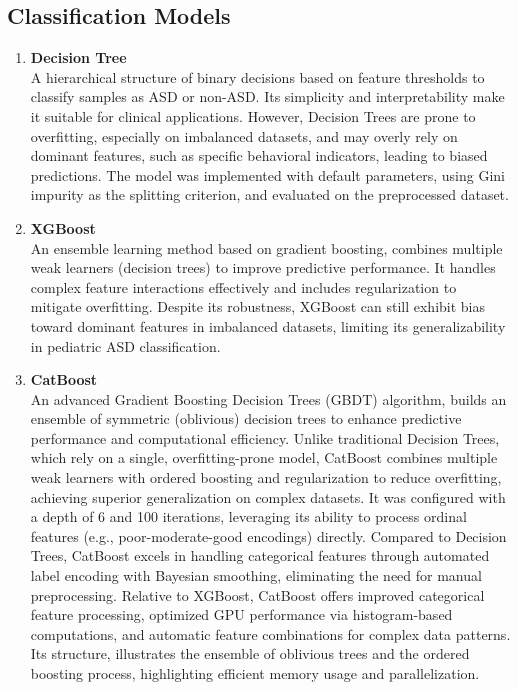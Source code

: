 \documentclass[conference]{IEEEtran}
\begin{document}
\subsection{Classification Models}
\begin{enumerate}
    \item \textbf{Decision Tree} \\
    A hierarchical structure of binary decisions based on feature thresholds to classify samples as ASD or non-ASD. Its simplicity and interpretability make it suitable for clinical applications. However, Decision Trees are prone to overfitting, especially on imbalanced datasets, and may overly rely on dominant features, such as specific behavioral indicators, leading to biased predictions. The model was implemented with default parameters, using Gini impurity as the splitting criterion, and evaluated on the preprocessed dataset.
    
    \item \textbf{XGBoost} \\
    An ensemble learning method based on gradient boosting, combines multiple weak learners (decision trees) to improve predictive performance. It handles complex feature interactions effectively and includes regularization to mitigate overfitting. Despite its robustness, XGBoost can still exhibit bias toward dominant features in imbalanced datasets, limiting its generalizability in pediatric ASD classification.
    
    \item \textbf{CatBoost} \\
    An advanced Gradient Boosting Decision Trees (GBDT) algorithm, builds an ensemble of symmetric (oblivious) decision trees to enhance predictive performance and computational efficiency. Unlike traditional Decision Trees, which rely on a single, overfitting-prone model, CatBoost combines multiple weak learners with ordered boosting and regularization to reduce overfitting, achieving superior generalization on complex datasets. It was configured with a depth of 6 and 100 iterations, leveraging its ability to process ordinal features (e.g., poor-moderate-good encodings) directly.
    Compared to Decision Trees, CatBoost excels in handling categorical features through automated label encoding with Bayesian smoothing, eliminating the need for manual preprocessing. Relative to XGBoost, CatBoost offers improved categorical feature processing, optimized GPU performance via histogram-based computations, and automatic feature combinations for complex data patterns. Its structure, illustrates the ensemble of oblivious trees and the ordered boosting process, highlighting efficient memory usage and parallelization.


\end{enumerate}
\end{document}
